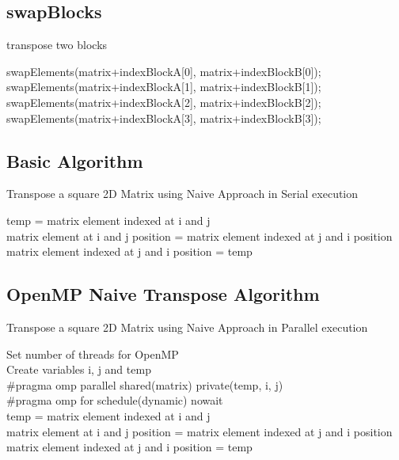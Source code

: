 \documentclass[10pt, onecolumn]{article}
\begin{document}
\subsection{swapBlocks}

    \begin{algorithm}[H]
        \label{Alg:swapBlocks}
        \caption{transpose two blocks}
        swapElements(matrix+indexBlockA[0], matrix+indexBlockB[0]);\\
	swapElements(matrix+indexBlockA[1], matrix+indexBlockB[1]);\\
	swapElements(matrix+indexBlockA[2], matrix+indexBlockB[2]);\\
	swapElements(matrix+indexBlockA[3], matrix+indexBlockB[3]);\\
    \end{algorithm}
%
\subsection{Basic Algorithm}

%
%
\begin{algorithm}[H]
    \label{Alg:BasicAlgorithm}
    \caption{Transpose a square 2D Matrix using Naive Approach in Serial execution}
    {
        {
            temp = matrix element indexed at i and j \\
            matrix element at i and j position = matrix element indexed at j and i position\\
            matrix element indexed at j and i position = temp
        }
    }
\end{algorithm}
%
\subsection{OpenMP Naive Transpose Algorithm}

%
\begin{algorithm}[H]
    \label{Alg:OpenMPNaiveAlgorithm}
    \caption{Transpose a square 2D Matrix using Naive Approach in Parallel execution}
    Set number of threads for OpenMP\\
    Create variables i, j and temp\\
    \#pragma omp parallel shared(matrix) private(temp, i, j)\\
    \#pragma omp for schedule(dynamic) nowait\\
    {
        {
            temp = matrix element indexed at i and j \\
            matrix element at i and j position = matrix element indexed at j and i position \\
            matrix element indexed at j and i position = temp
        }
    }
\end{algorithm}
%
\end{document}
